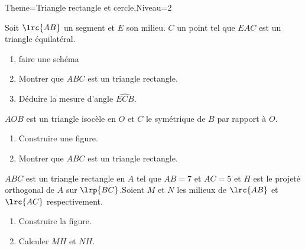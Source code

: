 \documentclass[a4paper,12pt]{article}
\begin{document}
\begin{Maquette}[Fiche]{Theme=Triangle rectangle et cercle,Niveau=2}
\begin{exercice}
Soit $\lrc{AB}$ un segment et $E$ son milieu. $C$ un point tel que $EAC$ est un triangle équilatéral.
\begin{enumerate}
\item faire une schéma
\item Montrer que $ABC$ est un triangle rectangle.
\item Déduire la mesure d'angle $\widehat{ECB}$.
\end{enumerate}
\end{exercice}

\begin{exercice}
$AOB$ est un triangle isocèle en $O$ et $C$ le symétrique de $B$ par rapport à $O$.
\begin{enumerate}
\item Construire une figure.
\item Montrer que $ABC$ est un triangle rectangle.
\end{enumerate}
\end{exercice}

\begin{exercice}
$ABC$ est un triangle rectangle en $A$ tel que $AB=7$ et $AC=5$ et $H$ est le projeté orthogonal de $A$ sur $\lrp{BC}$.Soient $M$ et $N$ les milieux de $\lrc{AB}$ et $\lrc{AC}$ respectivement.
\begin{enumerate}
\item Construire la figure.
\item Calculer $MH$ et $NH$.
\end{enumerate}
\end{exercice}




\end{Maquette}
\end{document}
